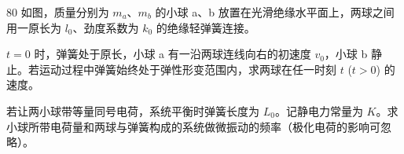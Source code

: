 \begin{problem}[第34届物理决赛][弹簧连接两小球运动]{80}
    如图，质量分别为 $m_{a}$、$m_{b}$ 的小球 a、b 放置在光滑绝缘水平面上，两球之间用一原长为 $l_{0}$、劲度系数为 $k_{0}$ 的绝缘轻弹簧连接。
    \begin{subproblem}
        \begin{subsubproblem}
            $t=0$ 时，弹簧处于原长，小球 a 有一沿两球连线向右的初速度 $v_{0}$，小球 b 静止。若运动过程中弹簧始终处于弹性形变范围内，求两球在任一时刻 $t$ ($t>0$) 的速度。
        \end{subsubproblem}
        \begin{subsubproblem}
            若让两小球带等量同号电荷，系统平衡时弹簧长度为 $L_{0}$。记静电力常量为 $K$。求小球所带电荷量和两球与弹簧构成的系统做微振动的频率（极化电荷的影响可忽略）。
        \end{subsubproblem}
    \end{subproblem}
\end{problem}